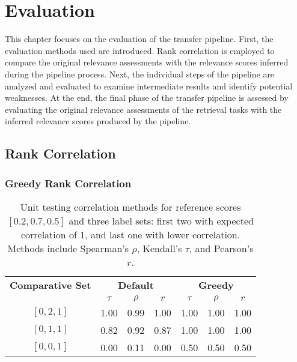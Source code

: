 \chapter{Evaluation}\label{evaluation}

This chapter focuses on the evaluation of the transfer pipeline. First, the evaluation methods used are introduced. Rank correlation is employed to compare the original relevance assessments with the relevance scores inferred during the pipeline process. Next, the individual steps of the pipeline are analyzed and evaluated to examine intermediate results and identify potential weaknesses. At the end, the final phase of the transfer pipeline is assessed by evaluating the original relevance assessments of the retrieval tasks with the inferred relevance scores produced by the pipeline.

\section{Rank Correlation}\label{rank-correlation}

\subsection{Greedy Rank Correlation}\label{greedy-rank-correlation}

\begin{table}[h!]
    \centering
    \caption{
        Unit testing correlation methods for reference scores $[0.2, 0.7, 0.5]$ and three label sets: first two with expected correlation of 1, and last one with lower correlation. Methods include Spearman's $\rho$, Kendall's $\tau$, and Pearson's $r$.
    }
    \begin{tabular}{ccccccc}
        \toprule
        \textbf{Comparative Set} & \multicolumn{3}{c}{\textbf{Default}} & \multicolumn{3}{c}{\textbf{Greedy}} \\
        \cmidrule(lr){2-4} \cmidrule(lr){5-7}
                                 & $\tau$ & $\rho$ & $r$ & $\tau$ & $\rho$ & $r$ \\
        \midrule
        
        $[0, 2, 1]$ & 1.00 & 0.99 & 1.00 & 1.00  & 1.00  & 1.00 \\
        $[0, 1, 1]$ & 0.82 & 0.92 & 0.87 & 1.00  & 1.00  & 1.00 \\
        $[0, 0, 1]$ & 0.00 & 0.11 & 0.00 & 0.50  & 0.50  & 0.50 \\
        \bottomrule
    \end{tabular}
\end{table}

